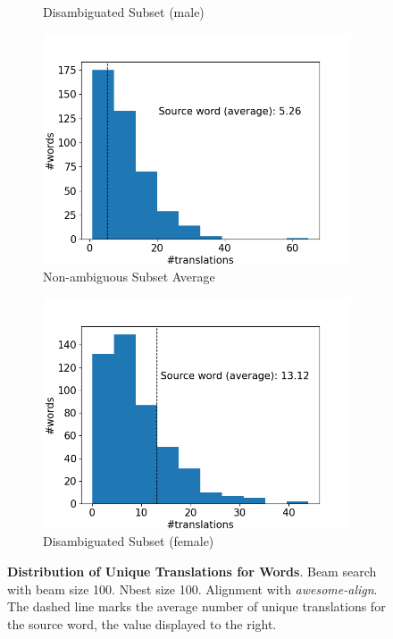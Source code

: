 \begin{figure}[!htb]
\begin{subfigure}{0.49\textwidth}
         \caption{Disambiguated Subset (male)}
     \end{subfigure}
     \begin{subfigure}{0.49\textwidth}
         \centering
         \includegraphics[width=\textwidth]{figures/alignment/align_100/word_translations_average.png}
         \caption{Non-ambiguous Subset Average}
     \end{subfigure}
     \hfill
     \begin{subfigure}{0.49\textwidth}
         \centering
         \includegraphics[width=\textwidth]{figures/alignment/align_100/word_translations_female.png}
         \caption{Disambiguated Subset (female)}
     \end{subfigure}
        \caption[Distribution of Unique Translations for Words: Beam search with beam size 100]{\textbf{Distribution of Unique Translations for Words}. Beam search with beam size 100. Nbest size 100. Alignment with \textit{awesome-align}. The dashed line marks the average number of unique translations for the source word, the value displayed to the right.}
        \label{fig:alignment_graphs_translation_100}

\end{figure}

